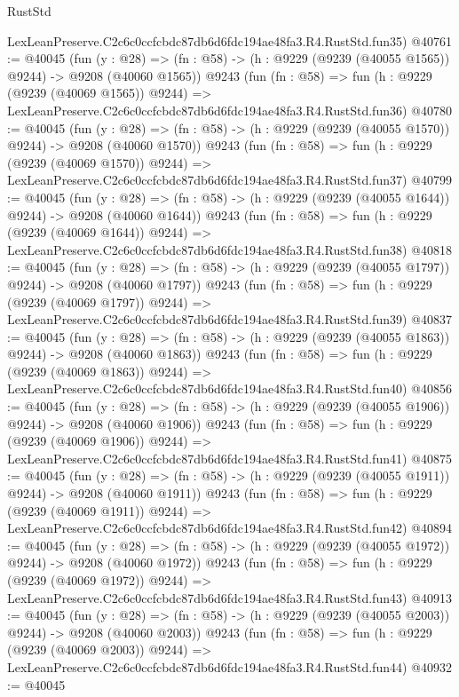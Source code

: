 \begin{lexlean}{RustStd}
\begin{coremodule}
    LexLeanPreserve.C2c6c0ccfcbdc87db6d6fdc194ae48fa3.R4.RustStd.fun35)
@40761 := @40045
    (fun (y : @28) =>
    (fn : @58) -> (h : @9229 (@9239 (@40055 @1565)) @9244) -> @9208 (@40060 @1565))
    @9243
    (fun (fn : @58) =>
    fun (h : @9229 (@9239 (@40069 @1565)) @9244) =>
    LexLeanPreserve.C2c6c0ccfcbdc87db6d6fdc194ae48fa3.R4.RustStd.fun36)
@40780 := @40045
    (fun (y : @28) =>
    (fn : @58) -> (h : @9229 (@9239 (@40055 @1570)) @9244) -> @9208 (@40060 @1570))
    @9243
    (fun (fn : @58) =>
    fun (h : @9229 (@9239 (@40069 @1570)) @9244) =>
    LexLeanPreserve.C2c6c0ccfcbdc87db6d6fdc194ae48fa3.R4.RustStd.fun37)
@40799 := @40045
    (fun (y : @28) =>
    (fn : @58) -> (h : @9229 (@9239 (@40055 @1644)) @9244) -> @9208 (@40060 @1644))
    @9243
    (fun (fn : @58) =>
    fun (h : @9229 (@9239 (@40069 @1644)) @9244) =>
    LexLeanPreserve.C2c6c0ccfcbdc87db6d6fdc194ae48fa3.R4.RustStd.fun38)
@40818 := @40045
    (fun (y : @28) =>
    (fn : @58) -> (h : @9229 (@9239 (@40055 @1797)) @9244) -> @9208 (@40060 @1797))
    @9243
    (fun (fn : @58) =>
    fun (h : @9229 (@9239 (@40069 @1797)) @9244) =>
    LexLeanPreserve.C2c6c0ccfcbdc87db6d6fdc194ae48fa3.R4.RustStd.fun39)
@40837 := @40045
    (fun (y : @28) =>
    (fn : @58) -> (h : @9229 (@9239 (@40055 @1863)) @9244) -> @9208 (@40060 @1863))
    @9243
    (fun (fn : @58) =>
    fun (h : @9229 (@9239 (@40069 @1863)) @9244) =>
    LexLeanPreserve.C2c6c0ccfcbdc87db6d6fdc194ae48fa3.R4.RustStd.fun40)
@40856 := @40045
    (fun (y : @28) =>
    (fn : @58) -> (h : @9229 (@9239 (@40055 @1906)) @9244) -> @9208 (@40060 @1906))
    @9243
    (fun (fn : @58) =>
    fun (h : @9229 (@9239 (@40069 @1906)) @9244) =>
    LexLeanPreserve.C2c6c0ccfcbdc87db6d6fdc194ae48fa3.R4.RustStd.fun41)
@40875 := @40045
    (fun (y : @28) =>
    (fn : @58) -> (h : @9229 (@9239 (@40055 @1911)) @9244) -> @9208 (@40060 @1911))
    @9243
    (fun (fn : @58) =>
    fun (h : @9229 (@9239 (@40069 @1911)) @9244) =>
    LexLeanPreserve.C2c6c0ccfcbdc87db6d6fdc194ae48fa3.R4.RustStd.fun42)
@40894 := @40045
    (fun (y : @28) =>
    (fn : @58) -> (h : @9229 (@9239 (@40055 @1972)) @9244) -> @9208 (@40060 @1972))
    @9243
    (fun (fn : @58) =>
    fun (h : @9229 (@9239 (@40069 @1972)) @9244) =>
    LexLeanPreserve.C2c6c0ccfcbdc87db6d6fdc194ae48fa3.R4.RustStd.fun43)
@40913 := @40045
    (fun (y : @28) =>
    (fn : @58) -> (h : @9229 (@9239 (@40055 @2003)) @9244) -> @9208 (@40060 @2003))
    @9243
    (fun (fn : @58) =>
    fun (h : @9229 (@9239 (@40069 @2003)) @9244) =>
    LexLeanPreserve.C2c6c0ccfcbdc87db6d6fdc194ae48fa3.R4.RustStd.fun44)
@40932 := @40045

\end{coremodule}
\end{lexlean}
